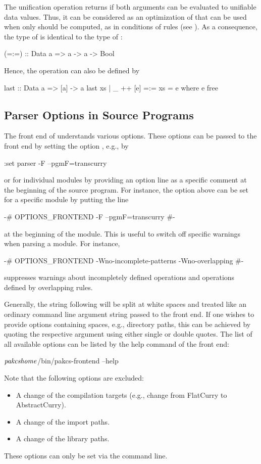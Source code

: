 The unification operation \ccode{=:=} returns 
if both arguments can be evaluated to unifiable data values.
Thus, it can be considered as an optimization of \ccode{===}
that can be used when only  should be computed,
as in conditions of rules (see \cite{AntoyHanus17FAoC}).
As a consequence, the type of \ccode{=:=} is identical
to the type of \ccode{===}:
%
\begin{curry}
(=:=) :: Data a => a -> a -> Bool
\end{curry}
%
Hence, the operation  can also be defined by
%
\begin{curry}
last :: Data a => [a] -> a
last xs | _ ++ [e] =:= xs = e
  where e free
\end{curry}
%

\subsection{Parser Options in Source Programs}

The front end of \CYS understands various options.
These options can be passed to the front end by setting
the \CYS option , e.g., by
%
\begin{curry}
:set parser -F --pgmF=transcurry
\end{curry}
%
or for individual modules by providing an option line as a specific
comment at the beginning of the source program.
For instance, the option above can be set for a specific module
by putting the line
%
\begin{curry}
{-# OPTIONS_FRONTEND -F --pgmF=transcurry #-}
\end{curry}
%
at the beginning of the module.
This is useful to switch off specific warnings when parsing a module.
For instance, 
%
\begin{curry}
{-# OPTIONS_FRONTEND -Wno-incomplete-patterns -Wno-overlapping #-}
\end{curry}
%
suppresses warnings about incompletely defined operations
and operations defined by overlapping rules.

Generally, the string following 
will be split at white spaces and treated like an ordinary
command line argument string passed to the front end.
If one wishes to provide options containing spaces, e.g., directory paths,
this can be achieved by quoting the respective argument
using either single or double quotes.
The list of all available options can be listed by the help command
of the front end:
\begin{curry}
$\mbox{\textit{pakcshome}}$/bin/pakcs-frontend --help
\end{curry}
%
Note that the following options are excluded:
\begin{itemize}
\item A change of the compilation targets
      (e.g., change from FlatCurry to AbstractCurry).
\item A change of the import  paths.
\item A change of the library paths.
\end{itemize}
%
These options can only be set via the command line.



